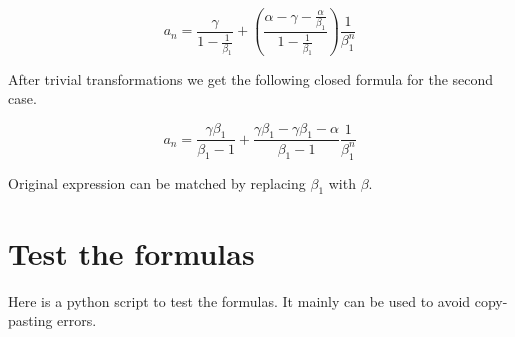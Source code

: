 \documentclass{article}
\begin{document}
$$
  a_n = \dfrac{\gamma}{1 - \frac{1}{\beta_1}} 
	+ \left(\dfrac{\alpha - \gamma - \frac{\alpha}{\beta_1}}
		{1 - \frac{1}{\beta_1}}\right) \frac{1}{\beta_1^n}
$$

After trivial transformations we get the following closed formula
for the second case.

\begin{equation}
  a_n = \dfrac{\gamma\beta_1}{\beta_1 - 1}
	+ \dfrac{\gamma\beta_1 - \gamma\beta_1 - \alpha}{\beta_1 - 1}
	  \dfrac{1}{\beta_1^n}
  \label{eq:div}
\end{equation}

Original expression can be matched by replacing $\beta_1$ with 
$\beta$.

\section{Test the formulas}
Here is a python script to test the formulas. It mainly can be used to
avoid copy-pasting errors.


\end{document}
